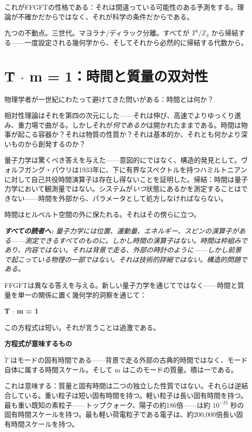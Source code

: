 \documentclass[11pt,openany]{book}
\newenvironment{laierspur}{%
  \par\vspace{4pt}%
  \noindent\small\itshape\color{blue!60!black}%
  \textbf{すべての読者へ:}\enspace\ignorespaces}{%
  \par\vspace{4pt}\normalsize\normalfont\normalcolor}
\begin{document}
これがFFGFTの性格である：それは間違っている可能性のある予測をする。理論が不確かだからではなく、それが科学の条件だからである。

九つの不動点。三世代。マヨラナ/ディラック分離。すべてが $T^4/\mathbb{Z}_3$ から帰結する——一度設定される幾何学から、そしてそれから必然的に帰結する代数から。

\medskip

\chapter{T̃ $\cdot$ m = 1：時間と質量の双対性}

物理学者が一世紀にわたって避けてきた問いがある：時間とは何か？

相対性理論はそれを第四の次元にした——それは伸び、高速でよりゆっくり進み、重力場で曲がる。しかしそれが\textit{何であるか}は開かれたままである。時間は物事が起こる容器か？それは物質の性質か？それは基本的か、それとも何かより深いものから創発するのか？

量子力学は驚くべき答えを与えた——意図的にではなく、構造的発見として。ヴォルフガング・パウリは1933年に、下に有界なスペクトルを持つハミルトニアンに対して自己共役時間演算子は存在し得ないことを証明した。帰結：時間は量子力学において観測量ではない。システムが\textit{いつ}状態にあるかを測定することはできない——時間を外部から、パラメータとして処方しなければならない。

時間はヒルベルト空間の外に保たれる。それはその傍らに立つ。

\begin{laierspur}
量子力学には位置、運動量、エネルギー、スピンの演算子がある——測定できるすべてのものに。しかし時間の演算子はない。時間は枠組みであり、内容ではない。それは背景で走る、外部の時計のように——しかし前景で起こっている物理の一部ではない。それは技術的詳細ではない。構造的問題である。
\end{laierspur}

FFGFTは異なる答えを与える。新しい量子力学を通じてではなく——時間と質量を単一の関係に置く幾何学的洞察を通じて：

\textbf{T̃ $\cdot$ m = 1}

この方程式は短い。それが言うことは過激である。

\textbf{方程式が意味するもの}

$\tilde{T}$ はモードの固有時間である——背景で走る外部の古典的時間ではなく、モード自体に属する時間スケール。そして m はこのモードの質量。積は一である。

これは意味する：質量と固有時間は二つの独立した性質ではない。それらは逆結合している。重い粒子は短い固有時間を持つ。軽い粒子は長い固有時間を持つ。最も重い既知の素粒子——トップクォーク、陽子の約186倍——は約 $10^{-25}$ 秒の固有時間スケールを持つ。最も軽い荷電粒子である電子は、約200,000倍長い固有時間スケールを持つ。
\end{document}
